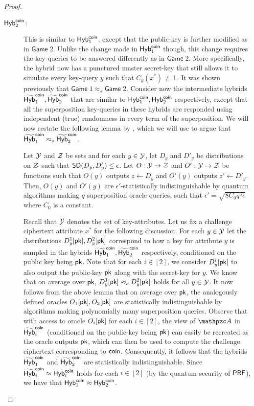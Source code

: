 \begin{proof}
\begin{description}
\item[$\mathsf{Hyb}_{2}^{\mathsf{coin}}$:] This is similar to $\mathsf{Hyb}_1^{\mathsf{coin}}$, except
that the public-key is further modified as in $\mathsf{Game}\;2$.
Unlike the change made in $\mathsf{Hyb}_1^{\mathsf{coin}}$ though, this change
requires the key-queries to be answered differently as in
$\mathsf{Game}\;2$. More specifically, the hybrid now has a
punctured master secret-key that still allows it to simulate
every key-query $y$ such that $C_y(x^*) \neq \bot$. It was shown
previously that $\mathsf{Game}\;1 \approx_s \mathsf{Game}\;2$.
Consider now the intermediate hybrids $\widetilde{\mathsf{Hyb}}_1^{\mathsf{coin}},
\widetilde{\mathsf{Hyb}}_2^{\mathsf{coin}}$ that are similar to $\mathsf{Hyb}_1^{\mathsf{coin}},
\mathsf{Hyb}_2^{\mathsf{coin}}$ respectively, except that all the superposition
key-queries in these hybrids are responded using independent (true)
randomness in every term of the superposition. We will now restate
the following lemma by \cite{EC:BonZha13}, which we will use to
argue that $\widetilde{\mathsf{Hyb}}_1^{\mathsf{coin}} \approx_s
\widetilde{\mathsf{Hyb}}_2^{\mathsf{coin}}$.

\begin{lemma}\cite{EC:BonZha13}
Let $\mathcal{Y}$ and $\mathcal{Z}$ be sets and for each $y \in \mathcal{Y}$, let $D_y$ and
$D'_y$ be distributions on $\mathcal{Z}$ such that $\mathsf{SD}(D_y, D'_y) \le
\epsilon$.  Let $O:\mathcal{Y} \rightarrow \mathcal{Z}$ and $O':\mathcal{Y} \rightarrow \mathcal{Z}$ be functions
such that $O(y)$ outputs $z \gets D_y$ and $O'(y)$ outputs $z' \gets
D'_y$. Then, $O(y)$ and $O'(y)$ are $\epsilon'$-statistically
indistinguishable by quantum algorithms making $q$ superposition
oracle queries, such that $\epsilon' = \sqrt{8C_0q^3\epsilon}$ where
$C_0$ is a constant.
\end{lemma}

Recall that $\mathcal{Y}$ denotes the set of key-attributes. Let us fix a
challenge ciphertext attribute $x^*$ for the following discussion.
For each $y \in \mathcal{Y}$ let the distributions $D^1_y[\mathsf{pk}], D^2_y[\mathsf{pk}]$
correspond to how a key for attribute $y$ is sampled in the hybrids
$\widetilde{\mathsf{Hyb}}^{\mathsf{coin}}_1, \widetilde{\mathsf{Hyb}}^{\mathsf{coin}}_2$ respectively,
conditioned on the public key being $\mathsf{pk}$. Note that for each $i \in
[2]$, we consider $D_y^i[\mathsf{pk}]$ to also output the public-key $\mathsf{pk}$
along with the secret-key for $y$. We know that on average over
$\mathsf{pk}$, $D_y^1[\mathsf{pk}] \approx_s D_y^2[\mathsf{pk}]$ holds for all $y \in \mathcal{Y}$.
It now follows from the above lemma that on average over $\mathsf{pk}$, the
analogously defined oracles $O_1[\mathsf{pk}], O_2[\mathsf{pk}]$ are statistically
indistinguishable by algorithms making polynomially many
superposition queries. Observe that with access to oracle $O_i[\mathsf{pk}]$
for each $i \in [2]$, the view of $\qA$ in
$\widetilde{\mathsf{Hyb}}^{\mathsf{coin}}_i$ (conditioned on the public-key being
$\mathsf{pk}$) can easily
be recreated as the oracle outputs $\mathsf{pk}$, which can then be used to
compute the challenge ciphertext corresponding to $\mathsf{coin}$.
Consequently, it follows that the hybrids $\widetilde{\mathsf{Hyb}}^{\mathsf{coin}}_1$
and $\widetilde{\mathsf{Hyb}}^{\mathsf{coin}}_2$ are statistically indistinguishable.
Since $\widetilde{\mathsf{Hyb}}^{\mathsf{coin}}_i \approx \mathsf{Hyb}^{\mathsf{coin}}_i$ holds for each
$i\in[2]$ (by the quantum-security of $\mathsf{PRF}$), we have that
$\mathsf{Hyb}^{\mathsf{coin}}_1 \approx \mathsf{Hyb}^{\mathsf{coin}}_2$.


\end{description}
\end{proof}

